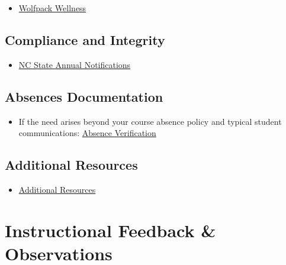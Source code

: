 \documentclass[
]{book}
\providecommand{\tightlist}{%
  \setlength{\itemsep}{0pt}\setlength{\parskip}{0pt}}
\begin{document}
\begin{itemize}
\tightlist
\item
  \href{https://wellness.ncsu.edu/wellness-day/}{Wolfpack Wellness}
\end{itemize}

\hypertarget{compliance-and-integrity}{%
\section{Compliance and Integrity}\label{compliance-and-integrity}}

\begin{itemize}
\tightlist
\item
  \href{https://compliance.ncsu.edu/annual-notices/?utm_source=newsletter\&utm_medium=email\&utm_campaign=annual-campus-notifications}{NC State Annual Notifications}
\end{itemize}

\hypertarget{absences-documentation}{%
\section{Absences Documentation}\label{absences-documentation}}

\begin{itemize}
\tightlist
\item
  If the need arises beyond your course absence policy and typical student communications: \href{https://dasa.ncsu.edu/support-and-advocacy/find-help/absence-notification/}{Absence Verification}
\end{itemize}

\hypertarget{additional-resources}{%
\section{Additional Resources}\label{additional-resources}}

\begin{itemize}
\tightlist
\item
  \href{https://docs.google.com/document/d/1XHivvQ13iZ-qqvm77h7R1OTw4cIv1VwA/edit?usp=sharing\&ouid=112414287104912137071\&rtpof=true\&sd=true}{Additional Resources}
\end{itemize}

\hypertarget{instructional-feedback-observations}{%
\chapter{Instructional Feedback \& Observations}\label{instructional-feedback-observations}}
\end{document}
